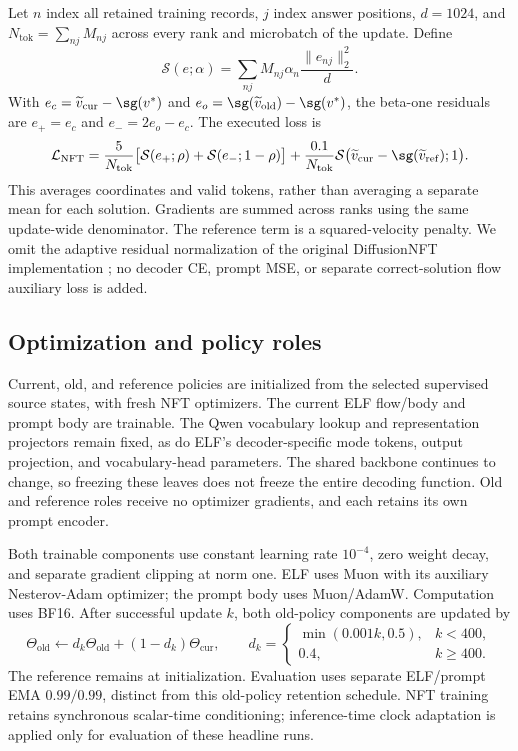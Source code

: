 Let $n$ index all retained training records, $j$ index answer positions, $d=1024$, and $N_{\mathrm{tok}}=\sum_{nj}M_{nj}$ across every rank and microbatch of the update. Define
\begin{equation}
 \mathcal S(e;\alpha)=\sum_{nj}M_{nj}\alpha_n\frac{\|e_{nj}\|_2^2}{d}.
 \label{eq:nfttokensum}
\end{equation}
With $e_c=\widetilde v_{\mathrm{cur}}-\sg(v^*)$ and $e_o=\sg(\widetilde v_{\mathrm{old}})-\sg(v^*)$, the beta-one residuals are $e_+=e_c$ and $e_-=2e_o-e_c$. The executed loss is
\begin{equation}
 \mathcal L_{\mathrm{NFT}}=
 \frac{5}{N_{\mathrm{tok}}}\bigl[\mathcal S(e_+;\rho)+\mathcal S(e_-;1-\rho)\bigr]
 +\frac{0.1}{N_{\mathrm{tok}}}\mathcal S\bigl(\widetilde v_{\mathrm{cur}}-\sg(\widetilde v_{\mathrm{ref}});1\bigr).
 \label{eq:nftexecutedloss}
\end{equation}
This averages coordinates and valid tokens, rather than averaging a separate mean for each solution. Gradients are summed across ranks using the same update-wide denominator. The reference term is a squared-velocity penalty. We omit the adaptive residual normalization of the original DiffusionNFT implementation \citep{diffusionnft}; no decoder CE, prompt MSE, or separate correct-solution flow auxiliary loss is added.

\subsection{Optimization and policy roles}

Current, old, and reference policies are initialized from the selected supervised source states, with fresh NFT optimizers. The current ELF flow/body and prompt body are trainable. The Qwen vocabulary lookup and representation projectors remain fixed, as do ELF's decoder-specific mode tokens, output projection, and vocabulary-head parameters. The shared backbone continues to change, so freezing these leaves does not freeze the entire decoding function. Old and reference roles receive no optimizer gradients, and each retains its own prompt encoder.

Both trainable components use constant learning rate $10^{-4}$, zero weight decay, and separate gradient clipping at norm one. ELF uses Muon with its auxiliary Nesterov-Adam optimizer; the prompt body uses Muon/AdamW. Computation uses BF16. After successful update $k$, both old-policy components are updated by
\begin{equation}
 \Theta_{\mathrm{old}}\leftarrow d_k\Theta_{\mathrm{old}}+(1-d_k)\Theta_{\mathrm{cur}},
 \qquad d_k=\begin{cases}\min(0.001k,0.5),&k<400,\\0.4,&k\ge400.\end{cases}
 \label{eq:nftoldema}
\end{equation}
The reference remains at initialization. Evaluation uses separate ELF/prompt EMA $0.99/0.99$, distinct from this old-policy retention schedule. NFT training retains synchronous scalar-time conditioning; inference-time clock adaptation is applied only for evaluation of these headline runs.

